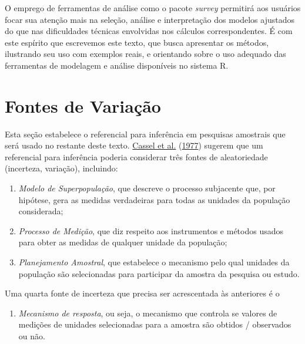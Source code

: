 \documentclass[
  12pt,
  brazilian,
]{book}
\providecommand{\tightlist}{%
  \setlength{\itemsep}{0pt}\setlength{\parskip}{0pt}}
\theoremstyle{definition}
\theoremstyle{definition}
\theoremstyle{definition}
\theoremstyle{definition}
\theoremstyle{remark}
\begin{document}
O emprego de ferramentas de análise como o pacote \emph{survey} permitirá aos
usuários focar sua atenção mais na seleção, análise e interpretação dos modelos
ajustados do que nas dificuldades técnicas envolvidas nos cálculos
correspondentes. É com este espírito que escrevemos este texto, que busca
apresentar os métodos, ilustrando seu uso com exemplos reais, e orientando sobre
o uso adequado das ferramentas de modelagem e análise disponíveis no sistema R.

\hypertarget{fontes-de-variauxe7uxe3o}{%
\section{Fontes de Variação}\label{fontes-de-variauxe7uxe3o}}

Esta seção estabelece o referencial para inferência em pesquisas amostrais que
será usado no restante deste texto. \protect\hyperlink{ref-cassel}{Cassel et al.} (\protect\hyperlink{ref-cassel}{1977}) sugerem que um referencial para
inferência poderia considerar três fontes de aleatoriedade (incerteza,
variação), incluindo:

\begin{enumerate}
\def\labelenumi{\arabic{enumi}.}
\item
  \emph{Modelo de Superpopulação}, que descreve o processo subjacente que, por
  hipótese, gera as medidas verdadeiras para todas as unidades da população
  considerada;
\item
  \emph{Processo de Medição}, que diz respeito aos instrumentos e métodos usados
  para obter as medidas de qualquer unidade da população;
\item
  \emph{Planejamento Amostral}, que estabelece o mecanismo pelo qual unidades da
  população são selecionadas para participar da amostra da pesquisa ou estudo.
\end{enumerate}

Uma quarta fonte de incerteza que precisa ser acrescentada às anteriores é o

\begin{enumerate}
\def\labelenumi{\arabic{enumi}.}
\setcounter{enumi}{3}
\tightlist
\item
  \emph{Mecanismo de resposta}, ou seja, o mecanismo que controla se valores de
  medições de unidades selecionadas para a amostra são obtidos / observados ou
  não.
\end{enumerate}
\end{document}
